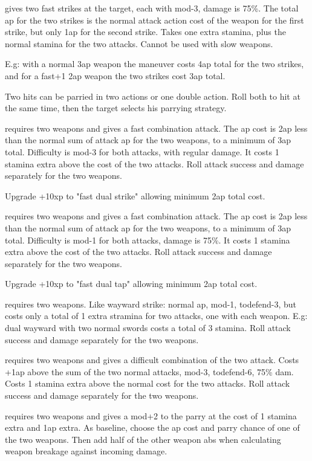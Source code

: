  gives two fast strikes at the target, each with mod-3, damage is 75\%. The total ap for the two strikes is the normal attack action cost of the weapon for the first strike, but only 1ap for the second strike. Takes one extra stamina, plus the normal stamina for the two attacks. Cannot be used with slow weapons.

E.g: with a normal 3ap weapon the maneuver costs 4ap total for the two strikes, and for a fast+1 2ap weapon the two strikes cost 3ap total.

Two hits can be parried in two actions or one double action. Roll both to hit at the same time, then the target selects his parrying strategy.


 requires two weapons and gives a fast combination attack. The ap cost is 2ap less than the normal sum of attack ap for the two weapons, to a minimum of 3ap total. Difficulty is mod-3 for both attacks, with regular damage. It costs 1 stamina extra above the cost of the two attacks.
Roll attack success and damage separately for the two weapons.

\noindent Upgrade +10xp to "fast dual strike" allowing minimum 2ap total cost.


 requires two weapons and gives a fast combination attack. The ap cost is 2ap less than the normal sum of attack ap for the two weapons, to a minimum of 3ap total. Difficulty is mod-1 for both attacks, damage is 75\%. It costs 1 stamina extra above the cost of the two attacks.
Roll attack success and damage separately for the two weapons.

\noindent Upgrade +10xp to "fast dual tap" allowing minimum 2ap total cost.


 requires two weapons. Like wayward strike: normal ap, mod-1, todefend-3, but costs only a total of 1 extra stramina for two attacks, one with each weapon. E.g: dual wayward with two normal swords costs a total of 3 stamina.
Roll attack success and damage separately for the two weapons.


 requires two weapons and gives a difficult combination of the two attack. Costs +1ap above the sum of the two normal attacks, mod-3, todefend-6, 75\% dam. Costs 1 stamina extra above the normal cost for the two attacks.
Roll attack success and damage separately for the two weapons.


 requires two weapons and gives a mod+2 to the parry at the cost of 1 stamina extra and 1ap extra. As baseline, choose the ap cost and parry chance of one of the two weapons. Then add half of the other weapon abs when calculating weapon breakage against incoming damage.

